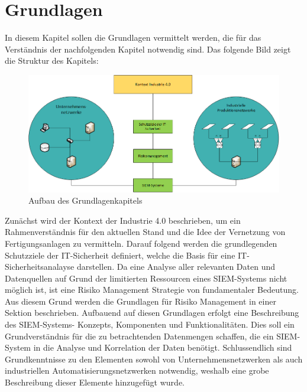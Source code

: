 \chapter{Grundlagen}
\label{cha:grundlagen}

In diesem Kapitel sollen die Grundlagen vermittelt werden, die für das Verständnis der nachfolgenden Kapitel notwendig sind. Das folgende Bild zeigt die Struktur des Kapitels:

\begin{figure}[h]
\centering
\includegraphics[width=175mm]{Zeichnungen/Grundlagenkapitel.png}
\caption{Aufbau des Grundlagenkapitels}
\label{fig:Aufbau des Grundlagenkapitels}
\end{figure}

Zunächst wird der Kontext der Industrie 4.0 beschrieben, um ein Rahmenverständnis für den aktuellen Stand und die Idee der Vernetzung von Fertigungsanlagen zu vermitteln. Darauf folgend werden die grundlegenden Schutzziele der IT-Sicherheit definiert, welche die Basis für eine IT-Sicherheitsanalayse darstellen. Da eine Analyse aller relevanten Daten und Datenquellen auf Grund der limitierten Ressourcen eines SIEM-Systems nicht möglich ist, ist eine Risiko Management Strategie von fundamentaler Bedeutung. Aus diesem Grund werden die Grundlagen für Risiko Management in einer Sektion beschrieben. Aufbauend auf diesen Grundlagen erfolgt eine Beschreibung des SIEM-Systems- Konzepts, Komponenten und  Funktionalitäten. Dies soll ein Grundverständnis für die zu betrachtenden Datenmengen schaffen, die ein SIEM-System in die Analyse und Korrelation der Daten benötigt. Schlussendlich sind Grundkenntnisse zu den Elementen sowohl von Unternehmensnetzwerken als auch industriellen Automatisierungsnetzwerken notwendig, weshalb eine grobe Beschreibung dieser Elemente hinzugefügt wurde.

